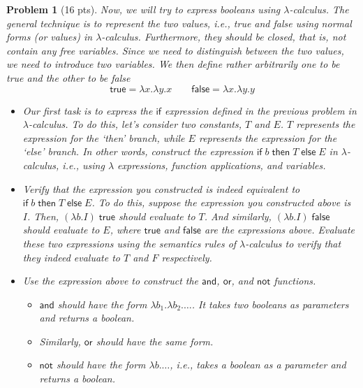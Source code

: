 \documentclass{article}
\newcommand{\lc}{$\lambda$-calculus}
\newcommand{\m}[1]{\mathsf{#1}}
\newcommand{\elam}[2]{\lambda{#1}.{#2}}
\newcommand{\eapp}[2]{#1 \; #2}
\newcommand{\eif}[3]{\m{if} \; #1 \; \m{then} \; #2 \; \m{else} \; #3}
\newtheorem{problem}{Problem}
\begin{document}
\begin{problem}[16 pts]
    Now, we will try to express booleans using \lc{}. The general technique is to represent the two values, i.e., true and false using
    normal forms (or values) in \lc{}. Furthermore, they should be closed, that is, not contain any free variables. Since we need to
    distinguish between the two values, we need to introduce two variables.
    We then define rather arbitrarily one to be true and the other to be false
    \[
        \m{true} = \elam{x}{\elam{y}{x}} \qquad
        \m{false} = \elam{x}{\elam{y}{y}}
    \]

    \begin{itemize}
        \item[(8 pts)] Our first task is to express the $\m{if}$ expression defined in the previous problem in \lc{}. To do this,
        let's consider two constants, $T$ and $E$. $T$ represents the expression for the `then' branch, while $E$ represents the
        expression for the `else' branch. In other words, construct the expression $\eif{b}{T}{E}$ in \lc{}, i.e., using $\lambda$
        expressions, function applications, and variables.

        \item[(2 pts)] Verify that the expression you constructed is indeed equivalent to $\eif{b}{T}{E}$. To do this, suppose the
        expression you constructed above is $I$. Then, $\eapp{(\elam{b}{I})}{\m{true}}$ should evaluate to $T$.
        And similarly, $\eapp{(\elam{b}{I})}{\m{false}}$ should evaluate to $E$, where $\m{true}$ and $\m{false}$ are the expressions
        above. Evaluate these two expressions using the semantics rules of \lc{} to verify that they indeed evaluate to $T$ and $F$
        respectively.
        
        \item[(6 pts)] Use the expression above to construct the $\m{and}$, $\m{or}$, and $\m{not}$ functions.
        \begin{itemize}
            \item $\m{and}$ should have the form $\elam{b_1}{\elam{b_2}{\ldots}}$. It takes two booleans as parameters and returns
            a boolean.
            \item Similarly, $\m{or}$ should have the same form.
            \item $\m{not}$ should have the form $\elam{b}{\ldots}$, i.e., takes a boolean as a parameter and returns a boolean.
        \end{itemize}
    \end{itemize}
\end{problem}
\end{document}
